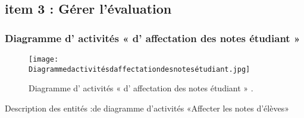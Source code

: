 \subsection{item 3 : Gérer l'évaluation}
\subsubsection{Diagramme d' activités « d' affectation des notes étudiant » }
\begin{figure}[ht]
	\centering
	\texttt{[image: Diagrammedactivitésdaffectationdesnotesétudiant.jpg]}
	\caption{Diagramme d' activités « d' affectation des notes étudiant » .}
	\label{fig:Diagramme d' activités  d' affectation des notes étudiant   }
\end{figure}
\FloatBarrier


{\Large \color{cyan} Description des entités :de diagramme d’activités «Affecter les notes d’élèves» }
